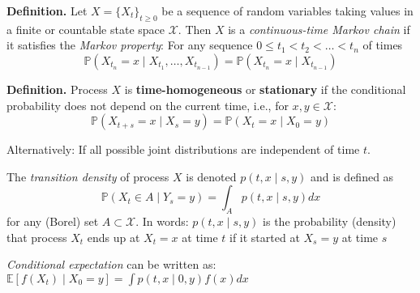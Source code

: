 \documentclass[11pt, aspectratio=169]{beamer}
\newenvironment{witemize}{\itemize\addtolength{\itemsep}{10pt}}{\enditemize}
\begin{document}
\begin{frame}{}

\textbf{Definition.} Let $X = \{X_t\}_{t \geq 0}$ be a sequence of random variables taking values in a finite or countable state space $\mathcal X$. Then $X$ is a \textit{continuous-time Markov chain} if it satisfies the \textit{Markov property}: For any sequence $0 \leq t_1 < t_2 < \ldots < t_n$ of times 
\begin{equation*}
	\mathbb P(X_{t_n} = x \mid X_{t_1}, \ldots, X_{t_{n-1}} ) = \mathbb P(X_{t_n} = x \mid X_{t_{n-1}} )
\end{equation*}


\vspace{5mm}
\textbf{Definition.} Process $X$ is \textbf{time-homogeneous} or \textbf{stationary} if the conditional probability does not depend on the current time, i.e., for $x, y \in \mathcal X$:
\begin{equation*}
	\mathbb P(X_{t+s} = x \mid X_s = y) = \mathbb P(X_t = x \mid X_0 = y)
\end{equation*}

\begin{witemize}
\item Alternatively: If all possible joint distributions are independent of time $t$.
\end{witemize}
\end{frame}


\begin{frame}{}
\begin{witemize}
\item The \textit{transition density} of process $X$ is denoted $p(t, x \mid s, y)$ and is defined as 
\begin{equation*}
	\mathbb P(X_t \in A \mid Y_s = y) = \int_A p(t, x \mid s, y) dx 
\end{equation*}
for any (Borel) set $A \subset \mathcal X$. In words: $p(t, x \mid s, y)$ is the probability (density) that process $X_t$ ends up at $X_t = x$ at time $t$ if it started at $X_s = y$ at time $s$

\item \textit{Conditional expectation} can be written as: $\mathbb E[ f(X_t) \mid X_0 = y] = \int p(t, x \mid 0, y) f(x) dx$
\end{witemize}
\end{frame}
\end{document}
